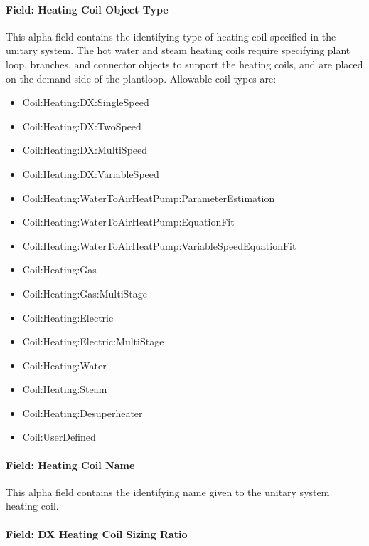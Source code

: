 \paragraph{Field: Heating Coil Object Type}\label{field-heating-coil-object-type-002}

This alpha field contains the identifying type of heating coil specified in the unitary system. The hot water and steam heating coils require specifying plant loop, branches, and connector objects to support the heating coils, and are placed on the demand side of the plantloop. Allowable coil types are:

\begin{itemize}
\item
  Coil:Heating:DX:SingleSpeed
\item
  Coil:Heating:DX:TwoSpeed
\item
  Coil:Heating:DX:MultiSpeed
\item
  Coil:Heating:DX:VariableSpeed
\item
  Coil:Heating:WaterToAirHeatPump:ParameterEstimation
\item
  Coil:Heating:WaterToAirHeatPump:EquationFit
\item
  Coil:Heating:WaterToAirHeatPump:VariableSpeedEquationFit
\item
  Coil:Heating:Gas
\item
  Coil:Heating:Gas:MultiStage
\item
  Coil:Heating:Electric
\item
  Coil:Heating:Electric:MultiStage
\item
  Coil:Heating:Water
\item
  Coil:Heating:Steam
\item
  Coil:Heating:Desuperheater
\item
  Coil:UserDefined
\end{itemize}

\paragraph{Field: Heating Coil Name}\label{field-heating-coil-name-002}

This alpha field contains the identifying name given to the unitary system heating coil.

\paragraph{Field: DX Heating Coil Sizing Ratio}\label{field-dx-heating-coil-sizing-ratio}

